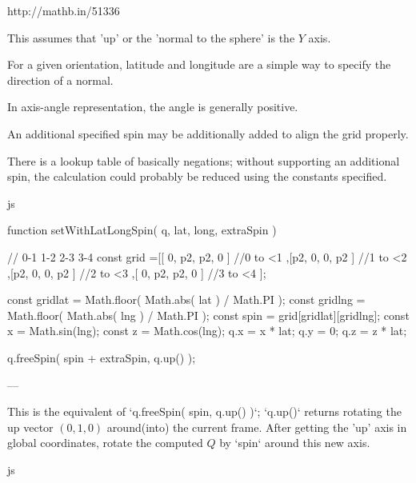 http://mathb.in/51336

This assumes that 'up' or the 'normal to the sphere' is the $Y$ axis.

For a given orientation, latitude and longitude are a simple way to specify the direction of a normal.  

In axis-angle representation, the angle is generally positive.

An additional specified spin may be additionally added to align the grid properly.

There is a lookup table of basically negations; without supporting an additional spin, the calculation could probably be reduced using the constants specified.

js

	function setWithLatLongSpin( q, lat, long, extraSpin )

	{
		          //  0-1 1-2 2-3 3-4
		const grid =[[ 0, p2, p2,  0 ]  //0 to <1
		            ,[p2,  0,  0, p2 ]  //1 to <2
		            ,[p2,  0,  0, p2 ]  //2 to <3
		            ,[ 0, p2, p2,  0 ]  //3 to <4
		            ];

		const gridlat = Math.floor( Math.abs( lat ) / Math.PI );
		const gridlng = Math.floor( Math.abs( lng ) / Math.PI );
		const spin = grid[gridlat][gridlng];
		const x = Math.sin(lng);
		const z = Math.cos(lng);
		q.x = x * lat; 
		q.y = 0;
		q.z = z * lat;

		q.freeSpin( spin + extraSpin, q.up() );
	}

---

This is the equivalent of `q.freeSpin( spin, q.up() )`; `q.up()` returns rotating the up vector $(0,1,0)$ around(into) the current frame.  After getting the 'up' axis in global coordinates, rotate the computed $Q$ by `spin` around this new axis.

js

